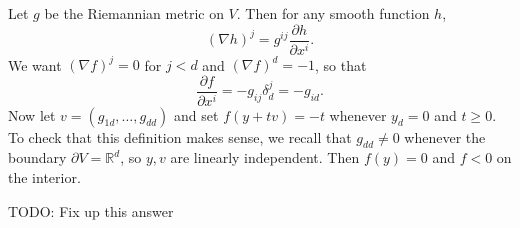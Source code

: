 \documentclass[10pt]{article}
\newcommand{\RR}{\mathbb{R}}
\theoremstyle{definition}
\begin{document}
Let $g$ be the Riemannian metric on $V$. Then for any smooth function $h$,
$$(\nabla h)^j = g^{ij} \frac{\partial h}{\partial x^i}.$$
We want $(\nabla f)^j = 0$ for $j < d$ and $(\nabla f)^d = -1$, so that
$$\frac{\partial f}{\partial x^i} = -g_{ij} \delta^j_d = -g_{id}.$$
Now let $v = (g_{1d}, \dots, g_{dd})$ and set $f(y + tv) = -t$ whenever $y_d = 0$ and $t \geq 0$.
To check that this definition makes sense, we recall that $g_{dd} \neq 0$ whenever the boundary $\partial V = \RR^d$, so $y,v$ are linearly independent.
Then $f(y) = 0$ and $f < 0$ on the interior.

TODO: Fix up this answer
\end{document}
